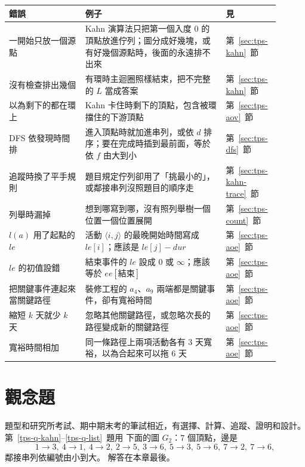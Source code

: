 \begin{center}
\begin{tabular}{>{\raggedright\arraybackslash}p{0.26\linewidth}>{\raggedright\arraybackslash}p{0.48\linewidth}>{\raggedright\arraybackslash}p{0.16\linewidth}}
\toprule
錯誤 & 例子 & 見 \\
\midrule
一開始只放一個源點 & Kahn 演算法只把第一個入度 $0$ 的頂點放進佇列；圖分成好幾塊，或
有好幾個源點時，後面的永遠排不出來 & 第~\ref{sec:tps-kahn}~節 \\
沒有檢查排出幾個 & 有環時主迴圈照樣結束，把不完整的 $L$ 當成答案 &
第~\ref{sec:tps-kahn}~節 \\
以為剩下的都在環上 & Kahn 卡住時剩下的頂點，包含被環擋住的下游頂點 &
第~\ref{sec:tps-aov}~節 \\
DFS 依發現時間排 & 進入頂點時就加進串列，或依 $d$ 排序；要在完成時插到最前面，等於
依 $f$ 由大到小 & 第~\ref{sec:tps-dfs}~節 \\
追蹤時換了平手規則 & 題目規定佇列卻用了「挑最小的」，或鄰接串列沒照題目的順序走 &
第~\ref{sec:tps-kahn-trace}~節 \\
列舉時漏掉 & 想到哪寫到哪，沒有照列舉樹一個位置一個位置展開 &
第~\ref{sec:tps-count}~節 \\
$l(a)$ 用了起點的 $\mathit{le}$ & 活動 $\langle i, j \rangle$ 的最晚開始時間寫成
$\mathit{le}[i]$；應該是 $\mathit{le}[j] - \mathit{dur}$ & 第~\ref{sec:tps-aoe}~節 \\
$\mathit{le}$ 的初值設錯 & 結束事件的 $\mathit{le}$ 設成 $0$ 或 $\infty$；應該等於
$\mathit{ee}[\text{結束}]$ & 第~\ref{sec:tps-aoe}~節 \\
把關鍵事件連起來當關鍵路徑 & 裝修工程的 $a_4$、$a_9$ 兩端都是關鍵事件，卻有寬裕時間 &
第~\ref{sec:tps-aoe}~節 \\
縮短 $k$ 天就少 $k$ 天 & 忽略其他關鍵路徑，或忽略次長的路徑變成新的關鍵路徑 &
第~\ref{sec:tps-aoe}~節 \\
寬裕時間相加 & 同一條路徑上兩項活動各有 $3$ 天寬裕，以為合起來可以拖 $6$ 天 &
第~\ref{sec:tps-aoe}~節 \\
\bottomrule
\end{tabular}
\end{center}

\section{觀念題}
\label{sec:tps-exercises}

題型和研究所考試、期中期末考的筆試相近，有選擇、計算、追蹤、證明和設計。 第~\ref{tps-q-kahn}--\ref{tps-q-list}~題用
下面的圖 $G_2$：$7$ 個頂點，邊是
\[
1 \to 3,\ 4 \to 1,\ 4 \to 2,\ 2 \to 5,\ 3 \to 6,\ 5 \to 3,\ 5 \to 6,\ 7 \to 2,\ 7 \to 6,
\]
鄰接串列依編號由小到大。 解答在本章最後。

